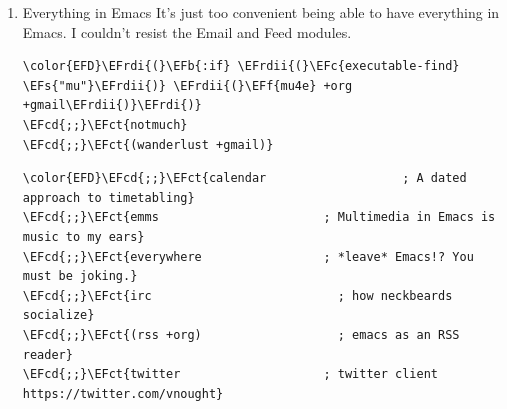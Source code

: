 \documentclass{scrartcl}
\newcommand{\EFs}[1]{\textcolor{EFs}{#1}} %
\newcommand{\EFb}[1]{\textcolor{EFb}{#1}} %
\newcommand{\EFct}[1]{\textcolor{EFct}{#1}} %
\newcommand{\EFc}[1]{\textcolor{EFc}{#1}} %
\newcommand{\EFf}[1]{\textcolor{EFf}{#1}} %
\newcommand{\EFcd}[1]{\textcolor{EFcd}{#1}} %
\newcommand{\EFrdi}[1]{#1} %
\newcommand{\EFrdii}[1]{#1} %
\begin{document}
\begin{enumerate}
\begin{Code}
\begin{Verbatim}[]
\EFcd{;;}\EFct{racket                     ; a DSL for DSLs}
\EFcd{;;}\EFct{raku                       ; the artist formerly known as perl6}
\EFcd{;;}\EFct{rest                       ; Emacs as a REST client}
\EFcd{;;}\EFct{rst                        ; ReST in peace}
\EFcd{;;}\EFct{(ruby +rails)              ; 1.step \{|i| p "Ruby is \#\{i.even? ? '}\textcolor[HTML]{81A1C1}{love}\EFct{' : '}\textcolor[HTML]{81A1C1}{life}\EFct{'\}"\}}
\EFcd{;;}\EFct{(rust +lsp)                ; Fe2O3.unwrap().unwrap().unwrap().unwrap()}
\EFcd{;;}\EFct{scala                      ; java, but good}
\EFcd{;;}\EFct{scheme                     ; a fully conniving family of lisps}
\EFcd{;;}\EFct{sh                         ; she sells \{ba,z,fi\}sh shells on the C xor}
\EFcd{;;}\EFct{sml                        ; no, the /other/ ML}
\EFcd{;;}\EFct{solidity                   ; do you need a blockchain? No.}
\EFcd{;;}\EFct{swift                      ; who asked for emoji variables?}
\EFcd{;;}\EFct{terra                      ; Earth and Moon in alignment for performance.}
\EFcd{;;}\EFct{web                        ; the tubes}
\EFcd{;;}\EFct{yaml                       ; JSON, but readable}
\EFcd{;;}\EFct{zig                        ; C, but simpler}
\end{Verbatim}
\end{Code}

\item Everything in Emacs
\label{sec:orgaeee4fb}
It's just too convenient being able to have everything in Emacs.
I couldn't resist the Email and Feed modules.
\begin{Code}
\begin{Verbatim}[]
\color{EFD}\EFrdi{(}\EFb{:if} \EFrdii{(}\EFc{executable-find} \EFs{"mu"}\EFrdii{)} \EFrdii{(}\EFf{mu4e} +org +gmail\EFrdii{)}\EFrdi{)}
\EFcd{;;}\EFct{notmuch}
\EFcd{;;}\EFct{(wanderlust +gmail)}
\end{Verbatim}
\end{Code}

\begin{Code}
\begin{Verbatim}[]
\color{EFD}\EFcd{;;}\EFct{calendar                   ; A dated approach to timetabling}
\EFcd{;;}\EFct{emms                       ; Multimedia in Emacs is music to my ears}
\EFcd{;;}\EFct{everywhere                 ; *leave* Emacs!? You must be joking.}
\EFcd{;;}\EFct{irc                          ; how neckbeards socialize}
\EFcd{;;}\EFct{(rss +org)                   ; emacs as an RSS reader}
\EFcd{;;}\EFct{twitter                    ; twitter client https://twitter.com/vnought}
\end{Verbatim}
\end{Code}
\end{enumerate}
\end{document}

